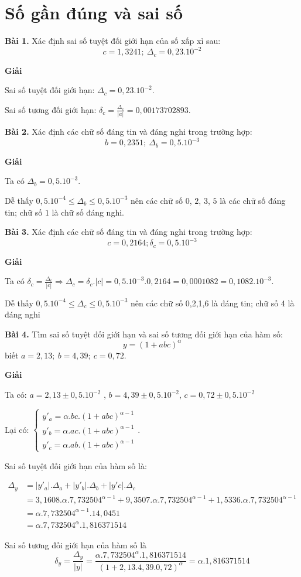 \chapter{Số gần đúng và sai số}

\textbf{Bài 1.} Xác định sai số tuyệt đối giới hạn của số xấp xỉ sau: $$c=1,3241;~\Delta_c=0,23.10^{-2}$$

\textbf{Giải}\par
Sai số tuyệt đối giới hạn: $\Delta_c=0,23.10^{-2}$.\par
Sai số tương đối giới hạn: $\delta_c=\frac{\Delta_c}{\lvert a\rvert}=0,00173702893$.\par

\textbf{Bài 2.} Xác định các chữ số đáng tin và đáng nghi trong trường hợp: $$b=0,2351;~\Delta_b=0,5.10^{-3}$$

\textbf{Giải}\par
Ta có $\Delta_b=0,5.10^{-3}$.\par
Dễ thấy $0,5.10^{-4}\leqslant \Delta_b \leqslant 0,5.10^{-3}$ nên các chữ số $0$, $2$, $3$, $5$ là các chữ số đáng tin; chữ số $1$ là chữ số đáng nghi.

\textbf{Bài 3.} Xác định các chữ số đáng tin và đáng nghi trong trường hợp: $$c=0,2164;\delta_c=0,5.10^{-3}$$

\textbf{Giải}\par
Ta có $\delta_c=\frac{\Delta_c}{|c|}\Rightarrow \Delta_c=\delta_c.|c|=0,5.10^{-3}.0,2164=0,0001082=0,1082.10^{-3}$.\par
Dễ thấy $0,5.10^{-4}\leqslant\Delta_c \leqslant 0,5.10^{-3}$ nên các chữ số 0,2,1,6 là đáng tin; chữ số 4 là đáng nghi\par

\textbf{Bài 4.} Tìm sai số tuyệt đối giới hạn và sai số tương đối giới hạn của hàm số: $$y=(1+abc)^{\alpha}$$ biết $a=2,13;~b=4,39;~c=0,72$.

\textbf{Giải}\par

Ta có: $a=2,13\pm 0,5.10^{-2}$ , $b=4,39\pm 0,5.10^{-2}$, $c=0,72\pm 0,5.10^{-2}$\par

Lại có:
$\begin{cases}
	y'_a=\alpha.bc.(1+abc)^{\alpha-1}\\
	y'_b=\alpha.ac.(1+abc)^{\alpha-1}\\
	y'_c=\alpha.ab.(1+abc)^{\alpha-1}
\end{cases}$.\par

Sai số tuyệt đối giới hạn của hàm số là:\par
\begin{align*}
	\Delta_y&=\left\lvert y'_a\right\rvert .\Delta_a+\left\lvert y'_b\right\rvert .\Delta_b+\left\lvert y'c\right\rvert . \Delta_c \\
	&=3,1608.\alpha .7,732504^{\alpha -1}  +9,3507.\alpha.7,732504^{\alpha -1}+ 1,5336.\alpha.7,732504^{\alpha -1}\\
	&=\alpha.7,732504^{\alpha -1}.14,0451\\
	&=\alpha.7,732504^{\alpha}.1,816371514
\end{align*}

Sai số tương đối giới hạn của hàm số là
$$\delta_y=\frac{\Delta_y}{|y|}=\frac{\alpha.7,732504^{\alpha}.1,816371514}{(1+2,13.4,39.0,72)^{\alpha}}=\alpha.1,816371514$$
